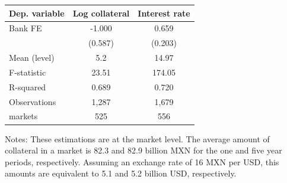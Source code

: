 \centering
\begin{threeparttable}
\begin{tabular}{lcc}
\toprule
\textbf{Dep. variable} & Log collateral & Interest rate \\
\midrule
Bank FE & -1.000   & 0.659 \\
& (0.587) & (0.203) \\
\midrule
Mean (level) & 5.2 & 14.97  \\

\midrule
F-statistic  & 23.51 & 174.05   \\
R-squared    & 0.689  & 0.720 \\
Observations & 1,287  & 1,679   \\
markets      & 525    & 556    \\

\bottomrule
\end{tabular}
\begin{tablenotes}[flushleft]
\tiny
\item Notes: These estimations are at the market level. The average amount of collateral in a market is 82.3 and 82.9 billion MXN for the one and five year periods, respectively. Assuming an exchange rate of 16 MXN per USD, this amounts are equivalent to 5.1 and 5.2 billion USD, respectively.
\end{tablenotes}
\end{threeparttable}